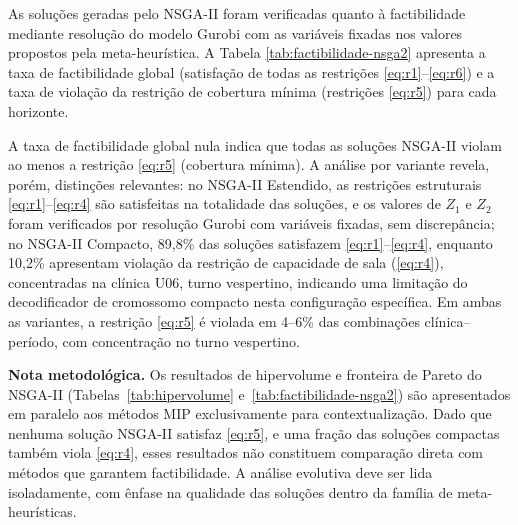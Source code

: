 As soluções geradas pelo NSGA-II foram verificadas quanto à factibilidade mediante resolução do modelo Gurobi com as variáveis fixadas nos valores propostos pela meta-heurística. A Tabela \ref{tab:factibilidade-nsga2} apresenta a taxa de factibilidade global (satisfação de todas as restrições \ref{eq:r1}--\ref{eq:r6}) e a taxa de violação da restrição de cobertura mínima (restrições \ref{eq:r5}) para cada horizonte.

\begin{table}[h]
	\centering
	\caption{Factibilidade das soluções NSGA-II: global $vs.$ violação da restrição de cobertura mínima.}
	\label{tab:factibilidade-nsga2}
	\fautor
\end{table}

A taxa de factibilidade global nula indica que todas as soluções NSGA-II violam ao menos a restrição \ref{eq:r5} (cobertura mínima). A análise por variante revela, porém, distinções relevantes: no NSGA-II Estendido, as restrições estruturais \ref{eq:r1}--\ref{eq:r4} são satisfeitas na totalidade das soluções, e os valores de $Z_1$ e $Z_2$ foram verificados por resolução Gurobi com variáveis fixadas, sem discrepância; no NSGA-II Compacto, 89{,}8\% das soluções satisfazem \ref{eq:r1}--\ref{eq:r4}, enquanto 10{,}2\% apresentam violação da restrição de capacidade de sala (\ref{eq:r4}), concentradas na clínica U06, turno vespertino, indicando uma limitação do decodificador de cromossomo compacto nesta configuração específica. Em ambas as variantes, a restrição \ref{eq:r5} é violada em 4--6\% das combinações clínica--período, com concentração no turno vespertino.

\noindent\textbf{Nota metodológica.} Os resultados de hipervolume e fronteira de Pareto do NSGA-II (Tabelas~\ref{tab:hipervolume} e~\ref{tab:factibilidade-nsga2}) são apresentados em paralelo aos métodos MIP exclusivamente para contextualização. Dado que nenhuma solução NSGA-II satisfaz \ref{eq:r5}, e uma fração das soluções compactas também viola \ref{eq:r4}, esses resultados não constituem comparação direta com métodos que garantem factibilidade. A análise evolutiva deve ser lida isoladamente, com ênfase na qualidade das soluções dentro da família de meta-heurísticas.

